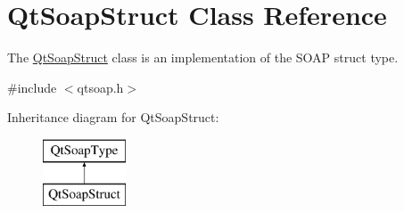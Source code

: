 \hypertarget{class_qt_soap_struct}{}\section{Qt\+Soap\+Struct Class Reference}
\label{class_qt_soap_struct}


The \mbox{\hyperlink{class_qt_soap_struct}{Qt\+Soap\+Struct}} class is an implementation of the S\+O\+AP struct type.  




{\ttfamily \#include $<$qtsoap.\+h$>$}

Inheritance diagram for Qt\+Soap\+Struct\+:\begin{figure}[H]
\begin{center}
\leavevmode
\includegraphics[height=2.000000cm]{class_qt_soap_struct}
\end{center}
\end{figure}
